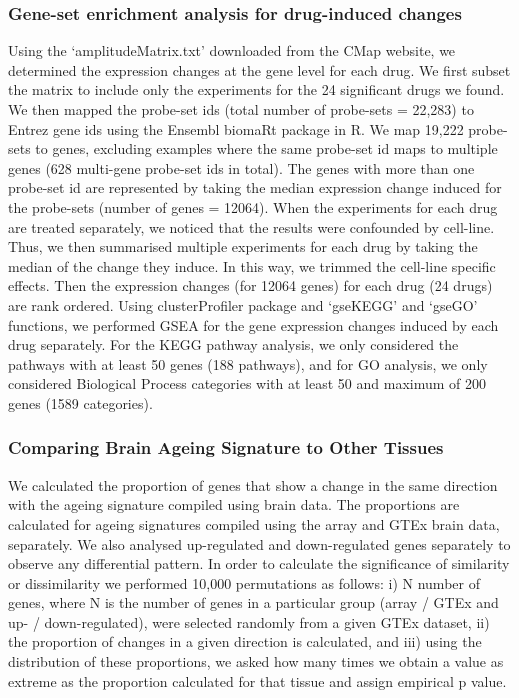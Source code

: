 \documentclass[12pt,twoside]{unicam}
\begin{document}
\hypertarget{drugHitGO}{%
\subsubsection{Gene-set enrichment analysis for drug-induced changes}\label{drugHitGO}}

Using the `amplitudeMatrix.txt' downloaded from the CMap website, we determined the expression changes at the gene level for each drug. We first subset the matrix to include only the experiments for the 24 significant drugs we found. We then mapped the probe-set ids (total number of probe-sets = 22,283) to Entrez gene ids using the Ensembl biomaRt package in R. We map 19,222 probe-sets to genes, excluding examples where the same probe-set id maps to multiple genes (628 multi-gene probe-set ids in total). The genes with more than one probe-set id are represented by taking the median expression change induced for the probe-sets (number of genes = 12064). When the experiments for each drug are treated separately, we noticed that the results were confounded by cell-line. Thus, we then summarised multiple experiments for each drug by taking the median of the change they induce. In this way, we trimmed the cell-line specific effects. Then the expression changes (for 12064 genes) for each drug (24 drugs) are rank ordered. Using clusterProfiler package and `gseKEGG' and `gseGO' functions, we performed GSEA for the gene expression changes induced by each drug separately. For the KEGG pathway analysis, we only considered the pathways with at least 50 genes (188 pathways), and for GO analysis, we only considered Biological Process categories with at least 50 and maximum of 200 genes (1589 categories).

\hypertarget{comparing-brain-ageing-signature-to-other-tissues}{%
\subsubsection{Comparing Brain Ageing Signature to Other Tissues}\label{comparing-brain-ageing-signature-to-other-tissues}}

We calculated the proportion of genes that show a change in the same direction with the ageing signature compiled using brain data. The proportions are calculated for ageing signatures compiled using the array and GTEx brain data, separately. We also analysed up-regulated and down-regulated genes separately to observe any differential pattern. In order to calculate the significance of similarity or dissimilarity we performed 10,000 permutations as follows: i) N number of genes, where N is the number of genes in a particular group (array / GTEx and up- / down-regulated), were selected randomly from a given GTEx dataset, ii) the proportion of changes in a given direction is calculated, and iii) using the distribution of these proportions, we asked how many times we obtain a value as extreme as the proportion calculated for that tissue and assign empirical p value.
\end{document}
